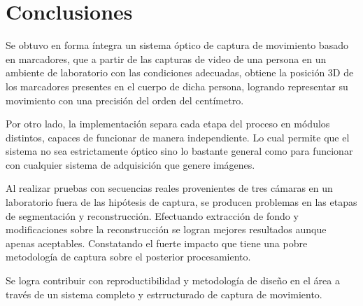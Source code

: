 \section{Conclusiones}

Se obtuvo en forma íntegra un sistema óptico de captura de movimiento basado en marcadores, que a partir de las capturas de video de una persona en un ambiente de laboratorio con las condiciones adecuadas, obtiene la posición 3D de  los marcadores presentes en el cuerpo de dicha persona, logrando representar su movimiento con una precisión del orden del centímetro.
%

Por otro lado, la implementación separa cada etapa del proceso en módulos distintos, capaces de funcionar de manera independiente. Lo cual permite que el sistema no sea estrictamente óptico sino lo bastante general como para funcionar con cualquier sistema de adquisición que genere imágenes. %

Al realizar pruebas con secuencias reales  provenientes de tres cámaras en un laboratorio fuera de las hipótesis de captura, se producen problemas en las etapas de segmentación y reconstrucción. Efectuando extracción de fondo y modificaciones sobre la reconstrucción se logran mejores resultados aunque apenas aceptables. Constatando el fuerte impacto que tiene una pobre metodología de captura sobre el posterior procesamiento.

Se logra contribuir con reproductibilidad y metodología de diseño en el área a través de un sistema completo y estrructurado de captura de movimiento.
